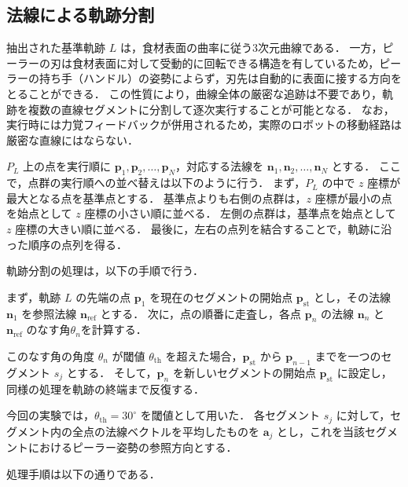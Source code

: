 \subsection{法線による軌跡分割}
\label{sec:peeling_trajectory_segmentation}

抽出された基準軌跡 $L$ は，食材表面の曲率に従う3次元曲線である．
一方，ピーラーの刃は食材表面に対して受動的に回転できる構造を有しているため，ピーラーの持ち手（ハンドル）の姿勢によらず，刃先は自動的に表面に接する方向をとることができる．
この性質により，曲線全体の厳密な追跡は不要であり，軌跡を複数の直線セグメントに分割して逐次実行することが可能となる．
なお，実行時には力覚フィードバックが併用されるため，実際のロボットの移動経路は厳密な直線にはならない．

$P_L$ 上の点を実行順に $\mathbf{p}_1, \mathbf{p}_2, \ldots, \mathbf{p}_N$，対応する法線を $\mathbf{n}_1, \mathbf{n}_2, \ldots, \mathbf{n}_N$ とする．
ここで，点群の実行順への並べ替えは以下のように行う．
まず，$P_L$ の中で $z$ 座標が最大となる点を基準点とする．
基準点よりも右側の点群は，$z$ 座標が最小の点を始点として $z$ 座標の小さい順に並べる．
左側の点群は，基準点を始点として $z$ 座標の大きい順に並べる．
最後に，左右の点列を結合することで，軌跡に沿った順序の点列を得る．

軌跡分割の処理は，以下の手順で行う．

まず，軌跡 $L$ の先端の点 $\mathbf{p}_1$ を現在のセグメントの開始点 $\mathbf{p}_{\mathrm{st}}$ とし，その法線 $\mathbf{n}_1$ を参照法線 $\mathbf{n}_{\mathrm{ref}}$ とする．
次に，点の順番に走査し，各点 $\mathbf{p}_n$ の法線 $\mathbf{n}_n$ と $\mathbf{n}_{\mathrm{ref}}$ のなす角$\theta_n$を計算する．


このなす角の角度 $\theta_n$ が閾値 $\theta_{\mathrm{th}}$ を超えた場合，$\mathbf{p}_{\mathrm{st}}$ から $\mathbf{p}_{n-1}$ までを一つのセグメント $s_j$ とする．
そして，$\mathbf{p}_n$ を新しいセグメントの開始点 $\mathbf{p}_{\mathrm{st}}$ に設定し，同様の処理を軌跡の終端まで反復する．

今回の実験では，$\theta_{\mathrm{th}} = 30^\circ$ を閾値として用いた．
各セグメント $s_j$ に対して，セグメント内の全点の法線ベクトルを平均したものを $\mathbf{a}_j$ とし，これを当該セグメントにおけるピーラー姿勢の参照方向とする．

処理手順は以下の通りである．

